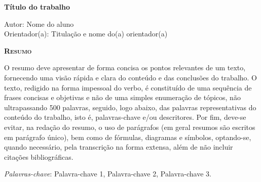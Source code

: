 \begin{center}
	{\Large{\textbf{Título do trabalho}}}
\end{center}

\vspace{1cm}

\begin{flushright}
	Autor: Nome do aluno\\
	Orientador(a): Titulação e nome do(a) orientador(a)
\end{flushright}

\vspace{1cm}

\begin{center}
	\Large{\textsc{\textbf{Resumo}}}
\end{center}

\noindent O resumo deve apresentar de forma concisa os pontos relevantes de um
texto, fornecendo uma visão rápida e clara do conteúdo e das conclusões do
trabalho. O texto, redigido na forma impessoal do verbo, é constituído de uma
sequência de frases concisas e objetivas e não de uma simples enumeração de
tópicos, não ultrapassando 500 palavras, seguido, logo abaixo, das palavras
representativas do conteúdo do trabalho, isto é, palavras-chave e/ou
descritores. Por fim, deve-se evitar, na redação do resumo, o uso de parágrafos
(em geral resumos são escritos em parágrafo único), bem como de fórmulas,
diagramas e símbolos, optando-se, quando necessário, pela transcrição na forma
extensa, além de não incluir citações bibliográficas.

\noindent\textit{Palavras-chave}: Palavra-chave 1, Palavra-chave 2, Palavra-chave 3.